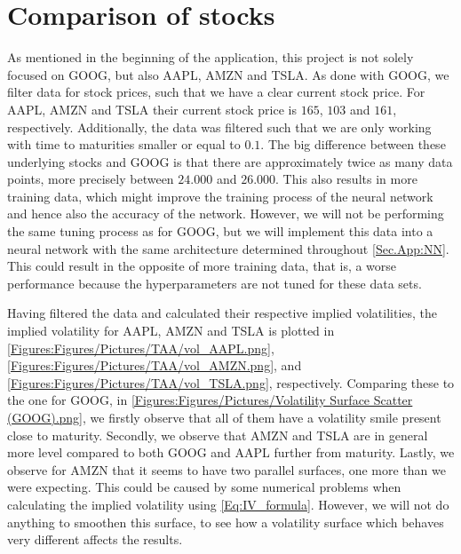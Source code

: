 \section{Comparison of stocks}
As mentioned in the beginning of the application, this project is not solely focused on GOOG, but also AAPL, AMZN and TSLA. As done with GOOG, we filter data for stock prices, such that we have a clear current stock price. For AAPL, AMZN and TSLA their current stock price is $165$, $103$ and $161$, respectively. Additionally, the data was filtered such that we are only working with time to maturities smaller or equal to $0.1$. The big difference between these underlying stocks and GOOG is that there are approximately twice as many data points, more precisely between $24.000$ and $26.000$. This also results in more training data, which might improve the training process of the neural network and hence also the accuracy of the network. However, we will not be performing the same tuning process as for GOOG, but we will implement this data into a neural network with the same architecture determined throughout \autoref{Sec.App:NN}. This could result in the opposite of more training data, that is, a worse performance because the hyperparameters are not tuned for these data sets.      

Having filtered the data and calculated their respective implied volatilities, the implied volatility for AAPL, AMZN and TSLA is plotted in \autoref{Figures:Figures/Pictures/TAA/vol_AAPL.png}, \autoref{Figures:Figures/Pictures/TAA/vol_AMZN.png}, and \autoref{Figures:Figures/Pictures/TAA/vol_TSLA.png}, respectively. Comparing these to the one for GOOG, in \autoref{Figures:Figures/Pictures/Volatility Surface Scatter (GOOG).png}, we firstly observe that all of them have a volatility smile present close to maturity. Secondly, we observe that AMZN and TSLA are in general more level compared to both GOOG and AAPL further from maturity. Lastly, we observe for AMZN that it seems to have two parallel surfaces, one more than we were expecting. This could be caused by some numerical problems when calculating the implied volatility using \eqref{Eq:IV_formula}. However, we will not do anything to smoothen this surface, to see how a volatility surface which behaves very different affects the results. 


